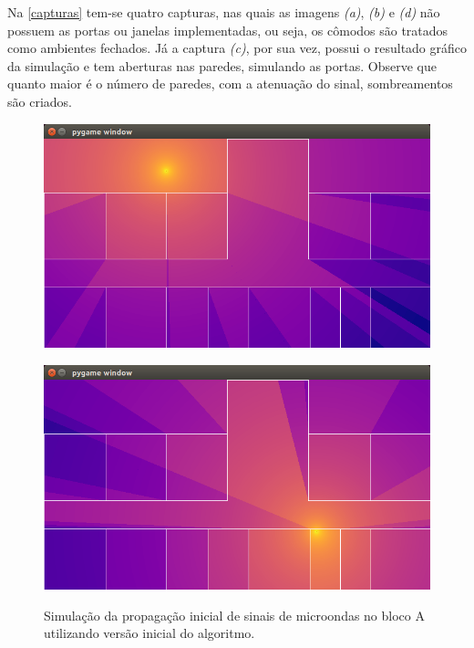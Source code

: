 \documentclass[
	12pt,				%
	twoside,			%
	a4paper,			%
	english,			%
	french,				%
	spanish,			%
	brazil				%
	]{abntex2}
\begin{document}
Na \autoref{capturas} tem-se quatro capturas, nas quais as imagens
\emph{(a)}, \emph{(b)} e \emph{(d)} não possuem as portas ou janelas
implementadas, ou seja, os cômodos são tratados como ambientes fechados.
Já a captura \emph{(c)}, por sua vez, possui o resultado gráfico da
simulação e tem aberturas nas paredes, simulando as portas. Observe que
quanto maior é o número de paredes, com a atenuação do sinal,
sombreamentos são criados.

\begin{figure}[!htb]
    
    \caption{\label{capturas} Simulação da propagação inicial de sinais de microondas no bloco A utilizando versão inicial do algoritmo.}
    \centering
    \begin{minipage}{0.4\textwidth}
        \centering \label{captura_1}
        \includegraphics[scale=0.28]{imagens/captura-1.jpg}
    \end{minipage}
    \hfill
    \begin{minipage}{0.4\textwidth}
        \centering \label{captura_2}
        \includegraphics[scale=0.28]{imagens/captura-2.jpg}

\end{minipage}
\end{figure}
\end{document}
